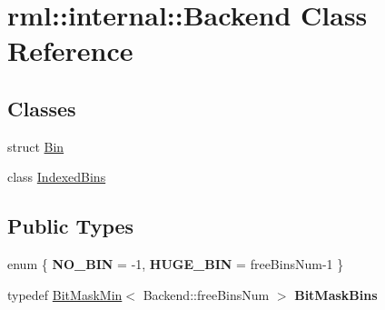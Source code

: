 \hypertarget{classrml_1_1internal_1_1Backend}{}\section{rml\+:\+:internal\+:\+:Backend Class Reference}
\label{classrml_1_1internal_1_1Backend}
\subsection*{Classes}
\begin{DoxyCompactItemize}
\item 
struct \hyperlink{structrml_1_1internal_1_1Backend_1_1Bin}{Bin}
\item 
class \hyperlink{classrml_1_1internal_1_1Backend_1_1IndexedBins}{Indexed\+Bins}
\end{DoxyCompactItemize}
\subsection*{Public Types}
\begin{DoxyCompactItemize}
\item 
\hypertarget{classrml_1_1internal_1_1Backend_aeb50ef58dc33e0245249fa626a59b462}{}enum \{ {\bfseries N\+O\+\_\+\+B\+I\+N} = -\/1, 
{\bfseries H\+U\+G\+E\+\_\+\+B\+I\+N} = free\+Bins\+Num-\/1
 \}\label{classrml_1_1internal_1_1Backend_aeb50ef58dc33e0245249fa626a59b462}

\item 
\hypertarget{classrml_1_1internal_1_1Backend_abd34c3204f7354f33022b3aca371ac45}{}typedef \hyperlink{classrml_1_1internal_1_1BitMaskMin}{Bit\+Mask\+Min}$<$ Backend\+::free\+Bins\+Num $>$ {\bfseries Bit\+Mask\+Bins}\label{classrml_1_1internal_1_1Backend_abd34c3204f7354f33022b3aca371ac45}

\end{DoxyCompactItemize}
